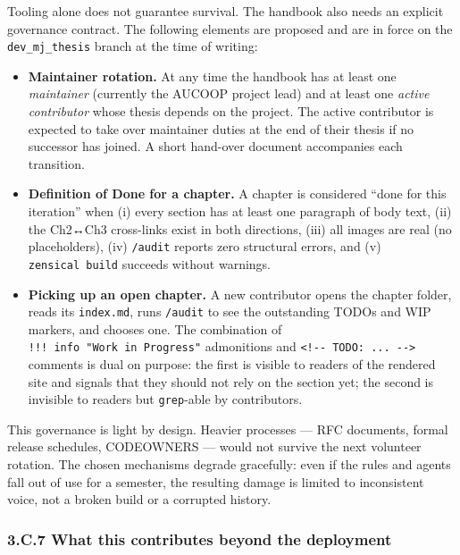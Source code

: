 Tooling alone does not guarantee survival. The handbook also needs an
explicit governance contract. The following elements are proposed and
are in force on the \texttt{dev\_mj\_thesis} branch at the time of
writing:

\begin{itemize}
\tightlist
\item
  \textbf{Maintainer rotation.} At any time the handbook has at least
  one \emph{maintainer} (currently the AUCOOP project lead) and at least
  one \emph{active contributor} whose thesis depends on the project. The
  active contributor is expected to take over maintainer duties at the
  end of their thesis if no successor has joined. A short hand-over
  document accompanies each transition.
\item
  \textbf{Definition of Done for a chapter.} A chapter is considered
  ``done for this iteration'' when (i) every section has at least one
  paragraph of body text, (ii) the Ch2↔Ch3 cross-links exist in both
  directions, (iii) all images are real (no placeholders), (iv)
  \texttt{/audit} reports zero structural errors, and (v)
  \texttt{zensical\ build} succeeds without warnings.
\item
  \textbf{Picking up an open chapter.} A new contributor opens the
  chapter folder, reads its \texttt{index.md}, runs \texttt{/audit} to
  see the outstanding TODOs and WIP markers, and chooses one. The
  combination of \texttt{!!!\ info\ "Work\ in\ Progress"} admonitions
  and \texttt{\textless{}!-\/-\ TODO:\ ...\ -\/-\textgreater{}} comments
  is dual on purpose: the first is visible to readers of the rendered
  site and signals that they should not rely on the section yet; the
  second is invisible to readers but \texttt{grep}-able by contributors.
\end{itemize}

This governance is light by design. Heavier processes --- RFC documents,
formal release schedules, CODEOWNERS --- would not survive the next
volunteer rotation. The chosen mechanisms degrade gracefully: even if
the rules and agents fall out of use for a semester, the resulting
damage is limited to inconsistent voice, not a broken build or a
corrupted history.

\hypertarget{c.7-what-this-contributes-beyond-the-deployment}{%
\subsubsection{3.C.7 What this contributes beyond the
deployment}\label{c.7-what-this-contributes-beyond-the-deployment}}

